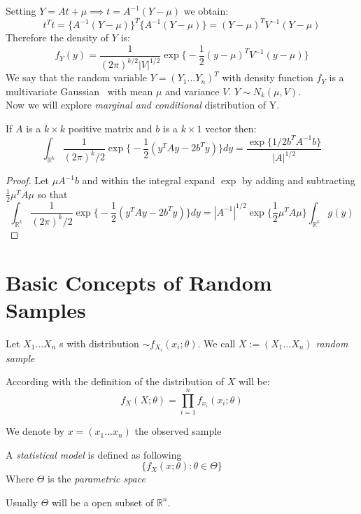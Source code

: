 Setting $Y=At+\mu \implies t=A^{-1} (Y- \mu)$ we obtain:
$$t^Tt=\{ A^{-1} (Y- \mu) \}^T \{ A^{-1}(Y-\mu) \}=(Y-\mu)^T V^{-1}(Y-\mu)$$
Therefore the density of $Y$ is:
$$f_Y(y)=\frac{1}{(2\pi)^{k/2}|V|^{1/2}}\exp \bigg\{ -\frac{1}{2}(y-\mu)^T V^{-1} (y-\mu) \bigg\} $$
We say that the random variable $Y=(Y_1...Y_n)^T$ with density function $f_Y$ is a multivariate Gaussian \rv \ with mean $\mu$ and variance $V$. $Y\sim N_k(\mu,V)$.\\

Now we will explore \textit{marginal and conditional} distribution of Y.\\
\begin{prop}
	If $A$ is a $k\times k$  positive matrix and $b$ is a $k\times 1$ vector then:
	\[
	\int_{\mathbb{R}^k} \frac{1}{(2\pi)^k/2} \exp\bigg\{ - \frac{1}{2} (y^TAy - 2 b^T y )\bigg\} dy = \frac{\exp \{ 1/2 b^TA^{-1} b \} }{|A|^{1/2}}
\]
\end{prop}
\begin{proof}
	Let $\mu A^{-1}b$ and within the integral expand $\exp{}$ by adding and subtracting  $\frac{1}{2}\mu^TA\mu$ so that
	$$\int_{\mathbb{R}^k} \frac{1}{(2\pi)^k/2} \exp\bigg\{ - \frac{1}{2} (y^TAy - 2 b^T y )\bigg\} dy=|A^{-1}|^{1/2}\exp \bigg\{ \frac{1}{2} \mu^TA\mu \bigg\} \int_{\mathbb{R}^k}g(y)$$
\end{proof}

\section{Basic Concepts of Random Samples}

\begin{defi}
	Let $X_1...X_n$ \iid   \rv s with distribution $\sim f_{X_i}(x_i; \theta)$. We call $X:=(X_1...X_n)	$ \textit{random sample}
\end{defi}
According with the definition of \rs the distribution of $X$ will be:
$$f_X(X;\theta)= \prod_{i=1}^{n}f_{x_i}(x_i;\theta)$$
\begin{defi}
	We denote by $x=(x_1...x_n)$ the observed sample
\end{defi}

\begin{defi}
	A \textit{statistical model} is defined as following
	$$\{ f_{X}(x;\theta) : \theta \in \Theta \}$$
	Where $\Theta $ is the \textit{parametric space}
\end{defi}
Usually $\Theta$ will be a open subset of $\mathbb{R}^n$.\\


